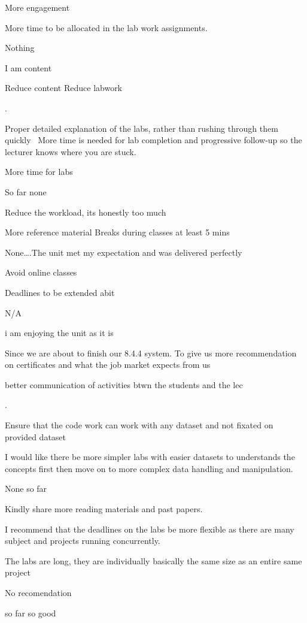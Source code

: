 \documentclass[
]{article}
\begin{document}
\begin{enumerate}
\begin{itemize}
    More engagement

    More time to be allocated in the lab work assignments.

    Nothing

    I am content

    Reduce content Reduce labwork

    .

    Proper detailed explanation of the labs, rather than rushing through
    them quickly~ More time is needed for lab completion and progressive
    follow-up so the lecturer knows where you are stuck.

    More time for labs

    So far none

    Reduce the workload, its honestly too much

    More reference material Breaks during classes at least 5 mins ~

    None\ldots.The unit met my expectation and was delivered perfectly

    Avoid online classes

    Deadlines to be extended abit

    N/A

    i am enjoying the unit as it is

    Since we are about to finish our 8.4.4 system. To give us more
    recommendation on certificates and what the job market expects from
    us

    better communication of activities btwn the students and the lec~

    .

    Ensure that the code work can work with any dataset and not fixated
    on provided dataset

    I would like there be more simpler labs with easier datasets to
    understands the concepts first then move on to more complex data
    handling and manipulation.

    None so far

    Kindly share more reading materials and past papers.

    I recommend that the deadlines on the labs be more flexible as there
    are many subject and projects running concurrently.

    The labs are long, they are individually basically the same size as
    an entire same project

    No recomendation

    so far so good


\end{itemize}
\end{enumerate}
\end{document}
